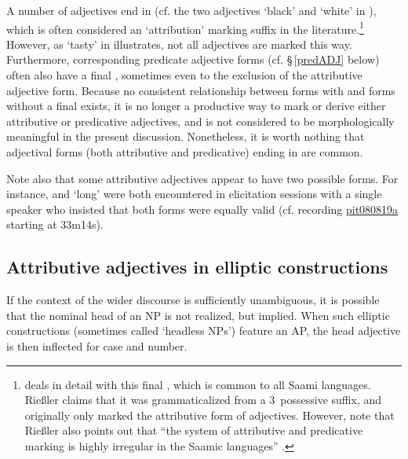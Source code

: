 A number of adjectives end in  (cf. the two adjectives  ‘black’ and  ‘white’ in ), which is often considered an ‘attribution’ marking suffix in the literature.\footnote{\citet[215-228]{Riessler2011} deals in detail with this final , which is common to all Saami languages. Rießler claims that it was grammaticalized from a 3\SGs\ possessive suffix, and originally only marked the attributive form of adjectives. However, note that Rießler also points out that “the system of attributive and predicative marking is highly irregular in the Saamic languages” \citep[215]{Riessler2011}.} 
However, as  ‘tasty’ in  illustrates, not all adjectives are marked this way. Furthermore, corresponding predicate adjective forms (cf. §\,\ref{predADJ} below) often also have a final , sometimes even to the exclusion of the attributive adjective form. Because no consistent relationship between forms with and forms without a final  exists, it is no longer a productive way to mark or derive either attributive or predicative adjectives, and is not considered to be morphologically meaningful in the present discussion. Nonetheless, it is worth nothing that adjectival forms (both attributive and predicative) ending in  are common. 

Note also that some attributive adjectives appear to have two possible forms. For instance,  and  ‘long’ were both encountered in elicitation sessions with a single speaker who insisted that both forms were equally valid (cf. recording \hyperlink{pit080819a}{pit080819a} starting at 33m14s). %


\subsection{Attributive adjectives in elliptic constructions}\label{ADJinHeadlessNPs}
If the context of the wider discourse is sufficiently unambiguous, it is possible that the nominal head of an NP is not realized, but implied. %
When such elliptic constructions (sometimes called ‘headless NPs’) feature an AP, the head adjective is then inflected for case and number. 

